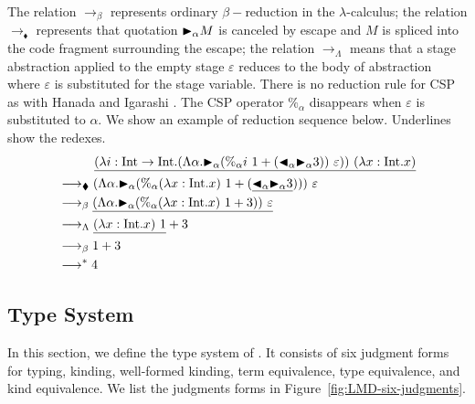 The relation $\longrightarrow_\beta$ represents ordinary $\beta-$reduction in the \(\lambda\)-calculus; the relation
$\longrightarrow_\blacklozenge$ represents that quotation ${\mathop{\blacktriangleright}}_\alpha M$ is canceled by escape and $M$ is spliced into the code fragment surrounding the escape;
the relation $\longrightarrow_\Lambda$ means that a stage abstraction applied to the empty stage $\varepsilon$ reduces to the body of abstraction
where $\varepsilon$ is substituted for the stage variable.
There is no reduction rule for CSP as with Hanada and Igarashi \cite{Hanada2014}.
The CSP operator $\%_\alpha$ disappears when $\varepsilon$ is substituted to $\alpha$.
We show an example of reduction sequence below.
Underlines show the redexes.
\begin{align*}
	 & \hspace{10mm} \underline{(\lambda i:\I\to\I.(\Lambda\alpha.\TB_\alpha (\%_\alpha i\ 1 + (\TBL_\alpha \TB_\alpha 3))\ \varepsilon))\ (\lambda x:\I.x)} \\
	 & \longrightarrow_\blacklozenge (\Lambda\alpha.\TB_\alpha (\%_\alpha (\lambda x:\I.x)\ 1 + (\underline{\TBL_\alpha \TB_\alpha 3})))\ \varepsilon        \\
	 & \longrightarrow_\beta \underline{(\Lambda\alpha.\TB_\alpha (\%_\alpha (\lambda x:\I.x)\ 1 + 3))\ \varepsilon}                                         \\
	 & \longrightarrow_\Lambda \underline{(\lambda x:\I.x)\ 1} + 3                                                                                           \\
	 & \longrightarrow_\beta 1 + 3                                                                                                                           \\
	 & \longrightarrow^* 4
\end{align*}


\subsection{Type System}


In this section, we define the type system of \LMD.
It consists of six judgment forms for typing, kinding, well-formed kinding, term equivalence, type equivalence, and kind equivalence.
We list the judgments forms in Figure~\ref{fig:LMD-six-judgments}.

